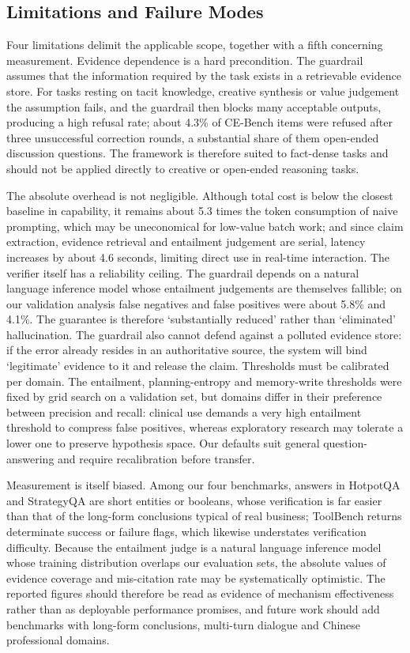 \documentclass[journal,10pt,a4paper]{IEEEtran}
\begin{document}
\subsection{Limitations and Failure Modes}
\label{sec:limitations}
Four limitations delimit the applicable scope, together with a fifth concerning measurement. Evidence dependence is a hard precondition. The guardrail assumes that the information required by the task exists in a retrievable evidence store. For tasks resting on tacit knowledge, creative synthesis or value judgement the assumption fails, and the guardrail then blocks many acceptable outputs, producing a high refusal rate; about 4.3\% of CE-Bench items were refused after three unsuccessful correction rounds, a substantial share of them open-ended discussion questions. The framework is therefore suited to fact-dense tasks and should not be applied directly to creative or open-ended reasoning tasks.

The absolute overhead is not negligible. Although total cost is below the closest baseline in capability, it remains about 5.3 times the token consumption of naive prompting, which may be uneconomical for low-value batch work; and since claim extraction, evidence retrieval and entailment judgement are serial, latency increases by about 4.6 seconds, limiting direct use in real-time interaction. The verifier itself has a reliability ceiling. The guardrail depends on a natural language inference model whose entailment judgements are themselves fallible; on our validation analysis false negatives and false positives were about 5.8\% and 4.1\%. The guarantee is therefore `substantially reduced' rather than `eliminated' hallucination. The guardrail also cannot defend against a polluted evidence store: if the error already resides in an authoritative source, the system will bind `legitimate' evidence to it and release the claim. Thresholds must be calibrated per domain. The entailment, planning-entropy and memory-write thresholds were fixed by grid search on a validation set, but domains differ in their preference between precision and recall: clinical use demands a very high entailment threshold to compress false positives, whereas exploratory research may tolerate a lower one to preserve hypothesis space. Our defaults suit general question-answering and require recalibration before transfer.

Measurement is itself biased. Among our four benchmarks, answers in HotpotQA and StrategyQA are short entities or booleans, whose verification is far easier than that of the long-form conclusions typical of real business; ToolBench returns determinate success or failure flags, which likewise understates verification difficulty. Because the entailment judge is a natural language inference model whose training distribution overlaps our evaluation sets, the absolute values of evidence coverage and mis-citation rate may be systematically optimistic. The reported figures should therefore be read as evidence of mechanism effectiveness rather than as deployable performance promises, and future work should add benchmarks with long-form conclusions, multi-turn dialogue and Chinese professional domains.
\end{document}
